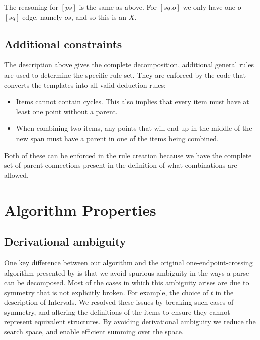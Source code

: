 The reasoning for $[ps]$ is the same as above.
For $[sq.o]$ we only have one $o$--$[sq]$ edge, namely $os$, and so this is an $X$.


\subsection{Additional constraints}
The description above gives the complete decomposition, additional general rules are used to determine the specific rule set.
They are enforced by the code that converts the templates into all valid deduction rules:

\begin{itemize}
  \item Items cannot contain cycles.
  This also implies that every item must have at least one point without a parent.
  \item When combining two items, any points that will end up in the middle of the new span must have a parent in one of the items being combined.
\end{itemize}

Both of these can be enforced in the rule creation because we have the complete set of parent connections present in the definition of what combinations are allowed.

\section{Algorithm Properties}

\subsection{Derivational ambiguity}

One key difference between our algorithm and the original one-endpoint-crossing algorithm presented by \textcite{ec} is that we avoid spurious ambiguity in the ways a parse can be decomposed.
Most of the cases in which this ambiguity arises are due to symmetry that is not explicitly broken.
For example, the choice of $t$ in the description of Intervals.
We resolved these issues by breaking such cases of symmetry, and altering the definitions of the items to ensure they cannot represent equivalent structures.
By avoiding derivational ambiguity we reduce the search space, and enable efficient summing over the space.


